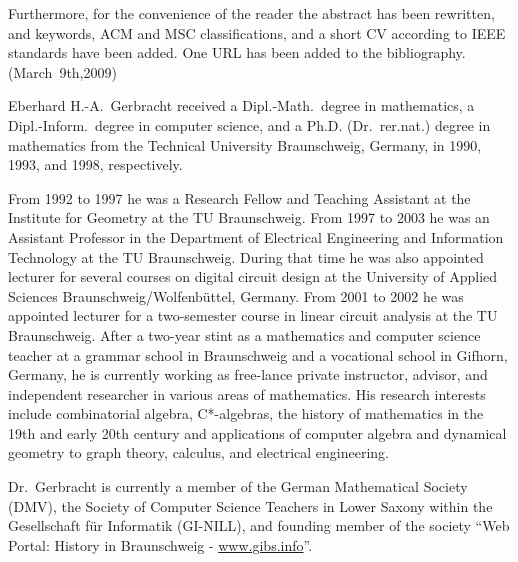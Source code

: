 \documentclass[10pt,journal,twocolumn,pagenumbers]{IEEEtran}
\begin{document}
Furthermore, for the convenience of the reader the abstract has been rewritten, and keywords, ACM and MSC classifications, and a short CV according to IEEE standards have been added. One URL has been added to the bibliography.\phantom{mmmmmmmmm}\hfill 
\phantom{m}\hfill (March~9th,2009)


\begin{biography}
{Eberhard H.-A.~Gerbracht}
received a Dipl.-Math.\ degree in mathematics, a Dipl.-Inform.\ degree in computer science, and a Ph.D. (Dr.\ rer.nat.) degree in mathematics from the Technical University Braunschweig, Germany, in 1990, 1993, and 1998, respectively.

From 1992 to 1997 he was a Research Fellow and Teaching Assistant at the Institute for Geometry at the TU Braunschweig. From 1997 to 2003 he was an Assistant Professor in the Department of Electrical Engineering and Information Technology at the TU Braunschweig. During that time he was also appointed lecturer for several courses on digital circuit design at the University of Applied Sciences Braunschweig/Wolfenb\"uttel, Germany. From 2001 to 2002 he was appointed lecturer for a two-semester course in linear circuit analysis at the TU Braunschweig. After a two-year stint as a mathematics and computer science teacher at a grammar school in Braunschweig and a vocational school in Gifhorn, Germany, he is currently working as free-lance private instructor, advisor, and independent researcher in various areas of mathematics. His research interests include combinatorial algebra, C*-algebras, the history of mathematics in the 19th and early 20th century and applications of computer algebra and dynamical geometry to graph theory, calculus, and electrical engineering.

Dr.~Gerbracht is currently a member of the German Mathematical Society (DMV), the Society of Computer Science Teachers in Lower Saxony within the Gesellschaft f\"ur Informatik (GI-NILL), and founding member of the society ``Web Portal: History in Braunschweig - \href{http://www.gibs.info}{www.gibs.info}''.
\end{biography}
\end{document}
